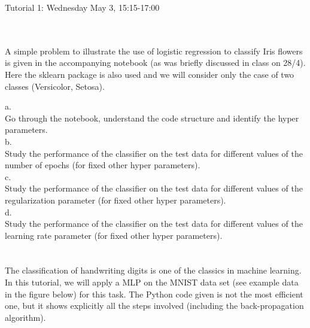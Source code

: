 \documentclass[10pt]{article}
\begin{document}
 
\medskip
\centerline{{\LARGE Tutorial 1: Wednesday May 3,   15:15-17:00}}
\vspace{0.5cm}


 \\

 \\

A simple problem to illustrate the use of logistic regression to 
classify Iris flowers is given in the accompanying notebook 
(as was briefly discussed in class on 28/4). Here the sklearn 
package is also used and we will consider only the case of 
two classes (Versicolor, Setosa). 

\noindent a.   \\
\noindent   Go through the notebook, understand the code 
structure  and identify the hyper parameters.   \\

\noindent b.   \\
\noindent  Study the performance of the classifier on the 
test data for different values of the number of epochs (for
fixed other hyper parameters). \\

\noindent c.   \\
\noindent  Study the performance of the classifier on the 
test data for different values of the regularization
parameter  (for fixed other hyper parameters). \\

\noindent d.   \\
\noindent  Study the performance of the classifier on the 
test data for different values of the learning rate 
parameter  (for fixed other hyper parameters). \\


 \\

 \\

The classification of handwriting digits is one of the classics 
in machine learning. In this tutorial, we will apply a MLP 
on the MNIST data set (see example data in the figure below) 
for this task. The Python  code given is not the most efficient 
one, but it shows explicitly all the  steps involved (including 
the back-propagation algorithm). \\
%
\begin{figure}[htpb]
 \begin{minipage}[t]{\linewidth}
  \centering{} 
 \end{minipage} \hfill
\label{f:F1} 
\end{figure}
%
\end{document}
